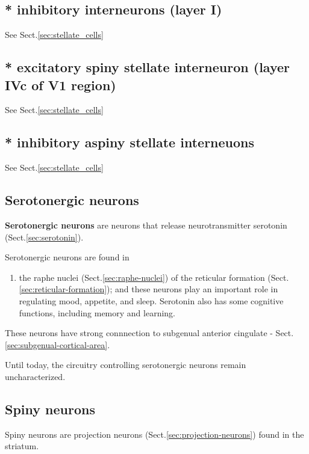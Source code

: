 \subsection{* inhibitory interneurons (layer I)}

See Sect.\ref{sec:stellate_cells}

\subsection{* excitatory spiny stellate interneuron (layer IVc of V1 region)}

See Sect.\ref{sec:stellate_cells}

\subsection{* inhibitory aspiny stellate interneuons}

See Sect.\ref{sec:stellate_cells}

\subsection{Serotonergic neurons}
\label{sec:serotonergic-neuron}


{\bf Serotonergic neurons} are neurons that release neurotransmitter serotonin
(Sect.\ref{sec:serotonin}).

Serotonergic neurons are found in 
\begin{enumerate}
  \item  the raphe nuclei (Sect.\ref{sec:raphe-nuclei}) of the reticular
  formation (Sect.\ref{sec:reticular-formation}); and these neurons play an important role
in regulating mood, appetite, and sleep. Serotonin also has some cognitive
functions, including memory and learning.

\end{enumerate}

These neurons have strong connnection to subgenual anterior cingulate -
Sect.\ref{sec:subgenual-cortical-area}.

Until today, the circuitry controlling serotonergic neurons remain
uncharacterized.

\subsection{Spiny neurons}
\label{sec:spiny-neurons}

Spiny neurons are projection neurons (Sect.\ref{sec:projection-neurons}) found
in the striatum. 

